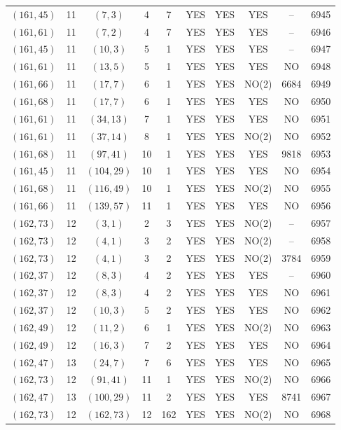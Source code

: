\begin{longtable}{|c|c|c|c|c|c|c|c|c|c|}
$(161, 45)$ & 11 & $(7, 3)$ & 4 & 7 & YES & YES & YES & -- & 6945\\
$(161, 61)$ & 11 & $(7, 2)$ & 4 & 7 & YES & YES & YES & -- & 6946\\
$(161, 45)$ & 11 & $(10, 3)$ & 5 & 1 & YES & YES & YES & -- & 6947\\
$(161, 61)$ & 11 & $(13, 5)$ & 5 & 1 & YES & YES & YES & NO & 6948\\
$(161, 66)$ & 11 & $(17, 7)$ & 6 & 1 & YES & YES & NO(2) & 6684 & 6949\\
$(161, 68)$ & 11 & $(17, 7)$ & 6 & 1 & YES & YES & YES & NO & 6950\\
$(161, 61)$ & 11 & $(34, 13)$ & 7 & 1 & YES & YES & YES & NO & 6951\\
$(161, 61)$ & 11 & $(37, 14)$ & 8 & 1 & YES & YES & NO(2) & NO & 6952\\
$(161, 68)$ & 11 & $(97, 41)$ & 10 & 1 & YES & YES & YES & 9818 & 6953\\
$(161, 45)$ & 11 & $(104, 29)$ & 10 & 1 & YES & YES & YES & NO & 6954\\
$(161, 68)$ & 11 & $(116, 49)$ & 10 & 1 & YES & YES & NO(2) & NO & 6955\\
$(161, 66)$ & 11 & $(139, 57)$ & 11 & 1 & YES & YES & YES & NO & 6956\\
$(162, 73)$ & 12 & $(3, 1)$ & 2 & 3 & YES & YES & NO(2) & -- & 6957\\
$(162, 73)$ & 12 & $(4, 1)$ & 3 & 2 & YES & YES & NO(2) & -- & 6958\\
$(162, 73)$ & 12 & $(4, 1)$ & 3 & 2 & YES & YES & NO(2) & 3784 & 6959\\
$(162, 37)$ & 12 & $(8, 3)$ & 4 & 2 & YES & YES & YES & -- & 6960\\
$(162, 37)$ & 12 & $(8, 3)$ & 4 & 2 & YES & YES & YES & NO & 6961\\
$(162, 37)$ & 12 & $(10, 3)$ & 5 & 2 & YES & YES & YES & NO & 6962\\
$(162, 49)$ & 12 & $(11, 2)$ & 6 & 1 & YES & YES & NO(2) & NO & 6963\\
$(162, 49)$ & 12 & $(16, 3)$ & 7 & 2 & YES & YES & YES & NO & 6964\\
$(162, 47)$ & 13 & $(24, 7)$ & 7 & 6 & YES & YES & YES & NO & 6965\\
$(162, 73)$ & 12 & $(91, 41)$ & 11 & 1 & YES & YES & NO(2) & NO & 6966\\
$(162, 47)$ & 13 & $(100, 29)$ & 11 & 2 & YES & YES & YES & 8741 & 6967\\
$(162, 73)$ & 12 & $(162, 73)$ & 12 & 162 & YES & YES & NO(2) & NO & 6968\\

\end{longtable}
